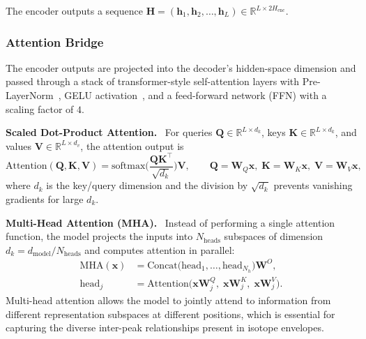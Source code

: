 \documentclass[12pt,a4paper]{report}
\begin{document}
The encoder outputs a sequence $\mathbf{H} = (\mathbf{h}_1, \mathbf{h}_2, \dots, \mathbf{h}_L) \in \mathbb{R}^{L \times 2H_{\mathrm{enc}}}$.

\bigskip
\subsubsection{Attention Bridge}

The encoder outputs are projected into the decoder's hidden-space dimension and passed through a stack of transformer-style self-attention layers with Pre-LayerNorm~\cite{preln}, GELU activation~\cite{gelu}, and a feed-forward network (FFN) with a scaling factor of $4$.

\textbf{Scaled Dot-Product Attention.}  For queries $\mathbf{Q} \in \mathbb{R}^{L \times d_k}$, keys $\mathbf{K} \in \mathbb{R}^{L \times d_k}$, and values $\mathbf{V} \in \mathbb{R}^{L \times d_v}$, the attention output is
\begin{equation}
\text{Attention}(\mathbf{Q}, \mathbf{K}, \mathbf{V})
= \text{softmax}\!\Big( \frac{\mathbf{Q}\mathbf{K}^\top}{\sqrt{d_k}} \Big)\mathbf{V},
\qquad \mathbf{Q} = \mathbf{W}_Q\mathbf{x},\; \mathbf{K} = \mathbf{W}_K\mathbf{x},\; \mathbf{V} = \mathbf{W}_V\mathbf{x},
\label{eq:attention}
\end{equation}
where $d_k$ is the key/query dimension and the division by $\sqrt{d_k}$ prevents vanishing gradients for large $d_k$.

\textbf{Multi-Head Attention (MHA).}  Instead of performing a single attention function, the model projects the inputs into $N_{\mathrm{heads}}$ subspaces of dimension $d_k = d_{\mathrm{model}} / N_{\mathrm{heads}}$ and computes attention in parallel:
\begin{align}
\text{MHA}(\mathbf{x}) &= \text{Concat}\!\big(\text{head}_1, \dots, \text{head}_{N_h}\big)\mathbf{W}^O, \label{eq:mha} \\
\text{head}_j &= \text{Attention}\!\big(\mathbf{x}\mathbf{W}_j^Q,\; \mathbf{x}\mathbf{W}_j^K,\; \mathbf{x}\mathbf{W}_j^V\big). \label{eq:mha_head}
\end{align}
Multi-head attention allows the model to jointly attend to information from different representation subspaces at different positions, which is essential for capturing the diverse inter-peak relationships present in isotope envelopes.
\end{document}
